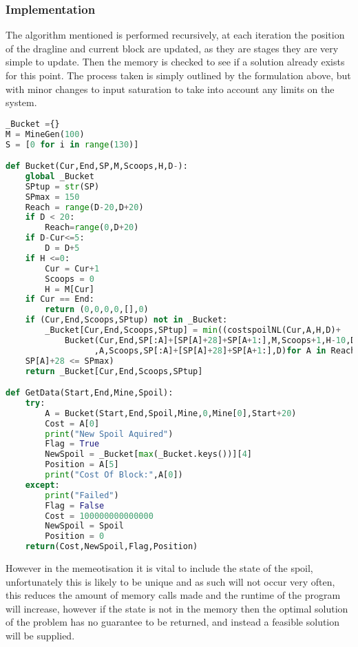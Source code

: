 \subsubsection{Implementation}
The algorithm mentioned is performed recursively, at each iteration the position of the dragline and current block are updated, as they are stages they are very simple to update. Then the memory is checked to see if a solution already exists for this point. The process taken is simply outlined by the formulation above, but with minor changes to input saturation to take into account any limits on the system.
\begin{lstlisting}[language=python]
_Bucket ={}
M = MineGen(100)
S = [0 for i in range(130)]

def Bucket(Cur,End,SP,M,Scoops,H,D-):
    global _Bucket
    SPtup = str(SP)
    SPmax = 150
    Reach = range(D-20,D+20) 
    if D < 20:
        Reach=range(0,D+20) 
    if D-Cur<=5:
        D = D+5
    if H <=0:
        Cur = Cur+1
        Scoops = 0
        H = M[Cur]
    if Cur == End:
        return (0,0,0,0,[],0)
    if (Cur,End,Scoops,SPtup) not in _Bucket:
        _Bucket[Cur,End,Scoops,SPtup] = min((costspoilNL(Cur,A,H,D)+
            Bucket(Cur,End,SP[:A]+[SP[A]+28]+SP[A+1:],M,Scoops+1,H-10,D)[0],Cur\
                  ,A,Scoops,SP[:A]+[SP[A]+28]+SP[A+1:],D)for A in Reach if\
    SP[A]+28 <= SPmax)
    return _Bucket[Cur,End,Scoops,SPtup]

def GetData(Start,End,Mine,Spoil):
    try:
        A = Bucket(Start,End,Spoil,Mine,0,Mine[0],Start+20)
        Cost = A[0]        
        print("New Spoil Aquired")
        Flag = True
        NewSpoil = _Bucket[max(_Bucket.keys())][4]
        Position = A[5]
        print("Cost Of Block:",A[0])
    except:
        print("Failed")
        Flag = False
        Cost = 100000000000000
        NewSpoil = Spoil
        Position = 0
    return(Cost,NewSpoil,Flag,Position)

\end{lstlisting}
However in the memeotisation it is vital to include the state of the spoil, unfortunately this is likely to be unique and as such will not occur very often, this reduces the amount of memory calls made and the runtime of the program will increase, however if the state is not in the memory then the optimal solution of the problem has no guarantee to be returned, and instead a feasible solution will be supplied. 

